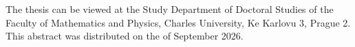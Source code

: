 \documentclass[12pt,a4paper]{report}
\begin{document}
{\centerline{\vbox{}}}

\bigskip

\noindent
The thesis can be viewed at the Study Department of Doctoral Studies of the Faculty of Mathematics and Physics, Charles University, Ke Karlovu 3, Prague 2. This abstract was distributed on the  of September 2026.

\newpage



\newpage

\tableofcontents

\newpage

\pagestyle{plain}
\setcounter{page}{1}









\end{document}
